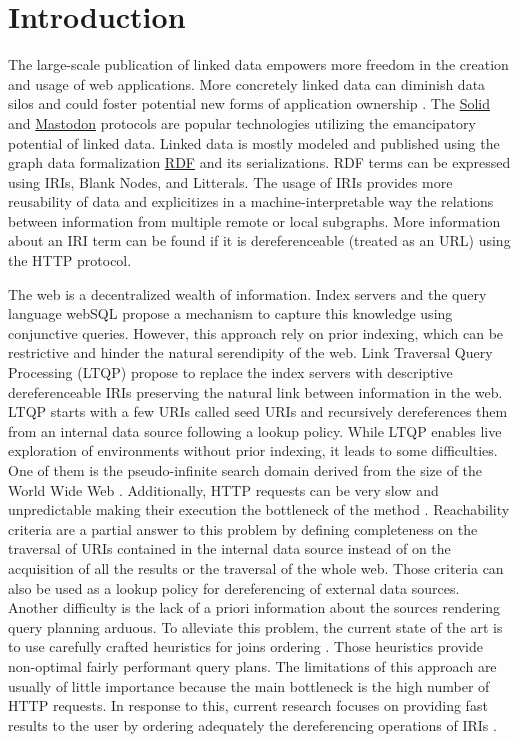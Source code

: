 \section{Introduction}
 
The large-scale publication of linked data empowers more freedom in the creation and usage of web applications.
More concretely linked data can diminish data silos \cite{Verstraete2022}
and could foster potential new forms of application ownership \cite{Mechant2021}.
The \href{https://solidproject.org/TR/protocol}{Solid} and
\href{https://docs.joinmastodon.org/}{Mastodon} protocols
are popular technologies utilizing the emancipatory potential of linked data.
Linked data is mostly modeled and published using the graph data formalization \href{https://www.w3.org/TR/rdf12-concepts/}{RDF} and its serializations.
RDF terms can be expressed using IRIs, Blank Nodes, and Litterals.
The usage of IRIs provides more reusability of data and explicitizes in a machine-interpretable way the relations between
information from multiple remote or local subgraphs.
More information about an IRI term can be found if it is dereferenceable (treated as an URL) using the HTTP protocol.


The web is a decentralized wealth of information.
Index servers and the query language webSQL \cite{Mendelzon1996} propose a mechanism to capture this knowledge using conjunctive queries.
However, this approach rely on prior indexing, which can be restrictive and hinder the natural serendipity of the web. 
Link Traversal Query Processing (LTQP) \cite{Hartig2012} propose to replace the index servers with descriptive dereferenceable IRIs 
preserving the natural link between information in the web.
LTQP starts with a few URIs called seed URIs and recursively dereferences them from an internal data source following a lookup policy.
While LTQP enables live exploration of environments without prior indexing, it leads to some difficulties.
One of them is the pseudo-infinite search domain derived from the size of the World Wide Web \cite{hartig2016walking}.
Additionally, HTTP requests can be very slow and unpredictable making their execution the bottleneck of the method \cite{hartig2016walking}.
Reachability criteria \cite{Hartig2012} are a partial answer to this problem by defining completeness on the traversal of URIs
contained in the internal data source instead of on the acquisition of all the results or the traversal of the whole web.
Those criteria can also be used as a lookup policy for dereferencing of external data sources.
Another difficulty is the lack of a priori information about the sources rendering query planning arduous.
To alleviate this problem, the current state of the art is to use carefully crafted heuristics for joins ordering \cite{Hartig2011}.
Those heuristics provide non-optimal fairly performant query plans.
The limitations of this approach are usually of little importance because the main bottleneck is the high number of HTTP requests.
In response to this, current research focuses on providing fast results to the user by ordering adequately the dereferencing operations of IRIs \cite{hartig2016walking}.

